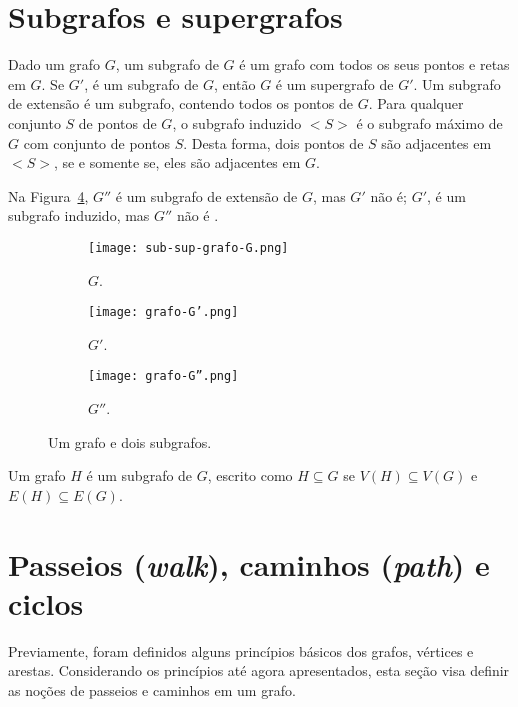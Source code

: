 \section{Subgrafos e supergrafos}
Dado um grafo $G$, um subgrafo de $G$ é um grafo com todos os seus pontos e retas em $G$. Se $G'$, é um subgrafo de $G$, então $G$ é um supergrafo de $G'$. Um subgrafo de extensão é um subgrafo, contendo todos os pontos de $G$. Para qualquer conjunto $S$ de pontos de $G$, o subgrafo induzido $<S>$ é o subgrafo máximo de $G$ com conjunto de pontos $S$. Desta forma, dois pontos de $S$ são adjacentes em $<S>$, se e somente se, eles são adjacentes em $G$.

Na Figura~\ref{sec2:grafo-subgrafo}, $G''$ é um subgrafo de extensão de $G$, mas $G'$ não é; $G'$, é um subgrafo induzido, mas $G''$ não é \cite{harary1994}.

\begin{figure}[!htb]
    \centering
    \begin{subfigure}{.3\textwidth}
        \centering
        \texttt{[image: sub-sup-grafo-G.png]}
        \caption{$G$.}
        \label{sec2:grafo-G}
    \end{subfigure}%
    \begin{subfigure}{.3\textwidth}
        \centering
        \texttt{[image: grafo-G'.png]}
        \caption{$G'$.}
        \label{sec2:grafo-G'}
    \end{subfigure}%
    \begin{subfigure}{.3\textwidth}
        \centering
        \texttt{[image: grafo-G''.png]}
        \caption{$G''$.}
        \label{sec2:grafo-G''}
    \end{subfigure}
    \caption{Um grafo e dois subgrafos.}
    \label{sec2:grafo-subgrafo}
\end{figure}

\begin{definition}
    Um grafo $H$ é um subgrafo de $G$, escrito como $H\subseteq G$ se $V(H) \subseteq V(G)$ e $E(H) \subseteq E(G)$.
\end{definition}


\section{Passeios (\emph{walk}), caminhos (\emph{path}) e ciclos}
Previamente, foram definidos alguns princípios básicos dos grafos, vértices e arestas. Considerando os princípios até agora apresentados, esta seção visa definir as noções de passeios e caminhos em um grafo.

